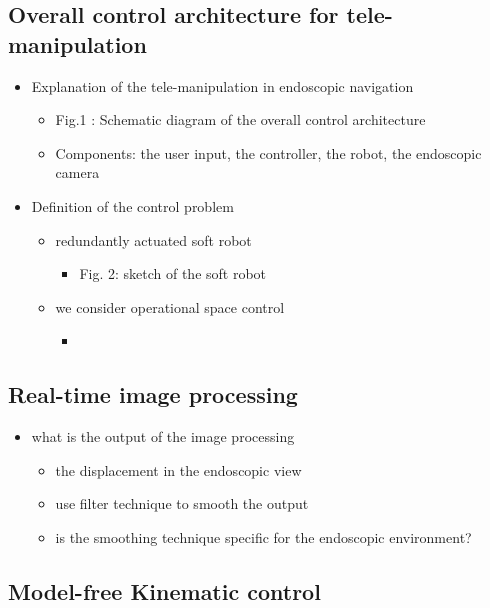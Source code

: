 \documentclass[journal,onecolumn]{IEEEtran}
\begin{document}
\subsection{Overall control architecture for tele-manipulation}
\label{sec:org9811a63}
\begin{itemize}
\item Explanation of the tele-manipulation in endoscopic navigation
\begin{itemize}
\item Fig.1 : Schematic diagram of the overall control architecture
\item Components: the user input, the controller, the robot, the endoscopic camera
\end{itemize}

\item Definition of the control problem
\begin{itemize}
\item redundantly actuated soft robot
\begin{itemize}
\item Fig. 2: sketch of the soft robot
\end{itemize}
\item we consider operational space control
\begin{itemize}
\item 
\end{itemize}
\end{itemize}
\end{itemize}

\subsection{Real-time image processing}
\label{sec:orgce3d6e5}
\begin{itemize}
\item what is the output of the image processing
\begin{itemize}
\item the displacement in the endoscopic view
\item use filter technique to smooth the output
\item is the smoothing technique specific for the endoscopic environment?
\end{itemize}
\end{itemize}

\subsection{Model-free Kinematic control}
\label{sec:org9e37a6a}
\end{document}

